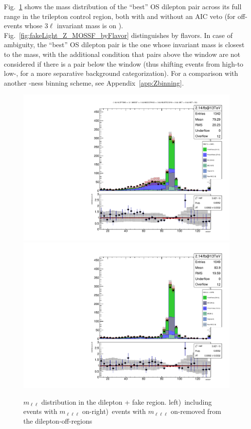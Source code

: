 Fig.~\ref{fig:fakeLight_Z_MOSSF} shows the mass distribution of the ``best'' OS dilepton pair across its full range in the trilepton control region, both with and without an AIC veto (for off-\Z events whose 3$\ell$ invariant mass is on \Z). Fig.~\ref{fig:fakeLight_Z_MOSSF_byFlavor} distinguishes by flavors. In case of ambiguity, the ``best'' OS dilepton pair is the one whose invariant mass is closest to the \Z mass, with the additional condition that pairs above the \Z window are not considered if there is a pair below the \Z window (thus shifting events from high-\Z to low-\Z, for a more separative background categorization). For a comparison with another \Z-ness binning scheme, see Appendix~\ref{app:Zbinning}.

\begin{figure}
\begin{center}
	\includegraphics[width=.5\textwidth]{Background/bkg_fakeLight/Z_MOSSF}%
	\includegraphics[width=.5\textwidth]{Background/bkg_fakeLight/Z_noAIC_MOSSF}
	\caption{$m_{\ell\ell}$ distribution in the dilepton + fake region. \enskip left)~including events with $m_{\ell\ell\ell}$ on-\Z \enskip right)~events with $m_{\ell\ell\ell}$ on-\Z removed from the dilepton-off-\Z regions
	\label{fig:fakeLight_Z_MOSSF}}
\end{center}
\end{figure}

